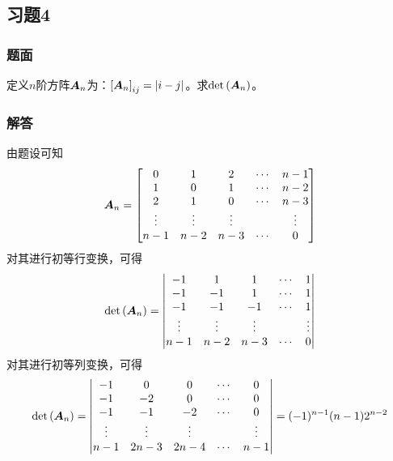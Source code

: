 \documentclass[9pt,xcolor=svgnames]{beamer} %
\begin{document}
\subsection*{习题4}
\begin{frame}
    \frametitle{题面}
    定义\(n\)阶方阵\(\boldsymbol{A}_n\)为：\(\left[ \boldsymbol{A}_n \right]_{ij}=\left|i-j \right|\)。求\(\mathrm{det}\left( \boldsymbol{A}_n \right)\)。
\end{frame}
\begin{frame}[allowframebreaks]
    \frametitle{解答}
    由题设可知
    \begin{equation*}
        \boldsymbol{A}_n=
        \begin{bmatrix}
            0      & 1      & 2      & \cdots & n-1    \\
            1      & 0      & 1      & \cdots & n-2    \\
            2      & 1      & 0      & \cdots & n-3    \\
            \vdots & \vdots & \vdots &        & \vdots \\
            n-1    & n-2    & n-3    & \cdots & 0
        \end{bmatrix}
    \end{equation*}
    对其进行初等行变换，可得
    \begin{equation*}
        \mathrm{det}\left( \boldsymbol{A}_n \right)=
        \begin{vmatrix}
            -1     & 1      & 1      & \cdots & 1      \\
            -1     & -1     & 1      & \cdots & 1      \\
            -1     & -1     & -1     & \cdots & 1      \\
            \vdots & \vdots & \vdots &        & \vdots \\
            n-1    & n-2    & n-3    & \cdots & 0
        \end{vmatrix}
    \end{equation*}
    对其进行初等列变换，可得
    \begin{equation*}
        \mathrm{det}\left( \boldsymbol{A}_n \right)=
        \begin{vmatrix}
            -1     & 0      & 0      & \cdots & 0      \\
            -1     & -2     & 0      & \cdots & 0      \\
            -1     & -1     & -2     & \cdots & 0      \\
            \vdots & \vdots & \vdots &        & \vdots \\
            n-1    & 2n-3   & 2n-4   & \cdots & n-1
        \end{vmatrix}=(-1)^{n-1}(n-1)2^{n-2}
    \end{equation*}
\end{frame}
\end{document}
